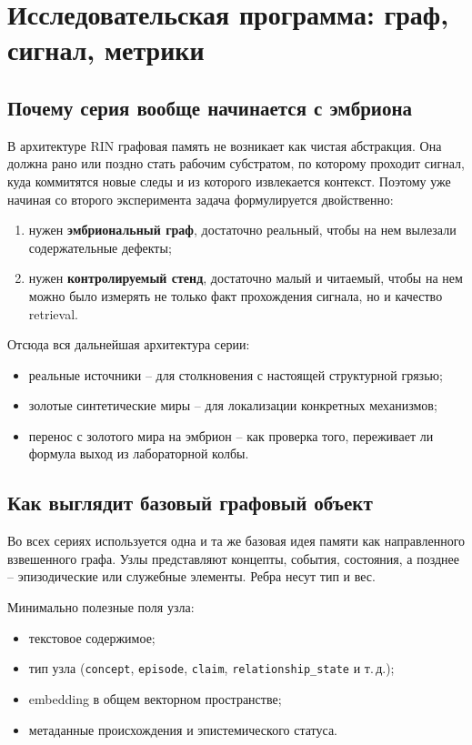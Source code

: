 \chapter{Исследовательская программа: граф, сигнал, метрики}

\section{Почему серия вообще начинается с эмбриона}

В архитектуре RIN графовая память не возникает как чистая абстракция. Она
должна рано или поздно стать рабочим субстратом, по которому проходит сигнал,
куда коммитятся новые следы и из которого извлекается контекст. Поэтому уже
начиная со второго эксперимента задача формулируется двойственно:

\begin{enumerate}[leftmargin=2em]
\item нужен \textbf{эмбриональный граф}, достаточно реальный, чтобы на нем
вылезали содержательные дефекты;
\item нужен \textbf{контролируемый стенд}, достаточно малый и читаемый, чтобы на
нем можно было измерять не только факт прохождения сигнала, но и качество
retrieval.
\end{enumerate}

Отсюда вся дальнейшая архитектура серии:

\begin{itemize}[leftmargin=2em]
\item реальные источники -- для столкновения с настоящей структурной грязью;
\item золотые синтетические миры -- для локализации конкретных механизмов;
\item перенос с золотого мира на эмбрион -- как проверка того, переживает ли
формула выход из лабораторной колбы.
\end{itemize}

\section{Как выглядит базовый графовый объект}

Во всех сериях используется одна и та же базовая идея памяти как направленного
взвешенного графа. Узлы представляют концепты, события, состояния, а позднее --
эпизодические или служебные элементы. Ребра несут тип и вес.

Минимально полезные поля узла:

\begin{itemize}[leftmargin=2em]
\item текстовое содержимое;
\item тип узла (\texttt{concept}, \texttt{episode}, \texttt{claim},
\texttt{relationship\_state} и т.\,д.);
\item embedding в общем векторном пространстве;
\item метаданные происхождения и эпистемического статуса.
\end{itemize}

